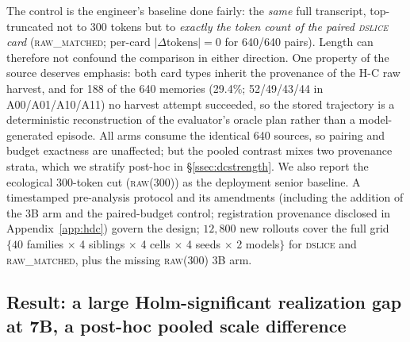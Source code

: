 The control is the engineer's baseline done fairly: the \emph{same} full transcript, top-truncated not to 300 tokens but to \emph{exactly the token count of the paired \textsc{dslice} card} (\textsc{raw\_matched}; per-card $|\Delta\text{tokens}|=0$ for 640/640 pairs). Length can therefore not confound the comparison in either direction. One property of the source deserves emphasis: both card types inherit the provenance of the H-C raw harvest, and for 188 of the 640 memories (29.4\%; 52/49/43/44 in A00/A01/A10/A11) no harvest attempt succeeded, so the stored trajectory is a deterministic reconstruction of the evaluator's oracle plan rather than a model-generated episode. All arms consume the identical 640 sources, so pairing and budget exactness are unaffected; but the pooled contrast mixes two provenance strata, which we stratify post-hoc in \S\ref{ssec:dcstrength}. We also report the ecological 300-token cut (\textsc{raw(300)}) as the deployment senior baseline. A timestamped pre-analysis protocol and its amendments (including the addition of the 3B arm and the paired-budget control; registration provenance disclosed in Appendix~\ref{app:hdc}) govern the design; $12{,}800$ new rollouts cover the full grid $\{40$ families $\times$ 4 siblings $\times$ 4 cells $\times$ 4 seeds $\times$ 2 models$\}$ for \textsc{dslice} and \textsc{raw\_matched}, plus the missing \textsc{raw(300)} 3B arm.

\subsection{Result: a large Holm-significant realization gap at 7B, a post-hoc pooled scale difference}
\label{ssec:dcresult}

